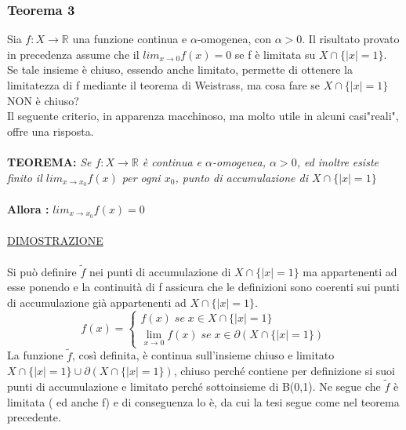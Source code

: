 \documentclass[fontsize = 20px, paper = a4]{article}
\begin{document}
\subsubsection{Teorema 3}
Sia $f: X \to \mathbb{R}$ una funzione continua e $\alpha$-omogenea, con $\alpha > 0$. Il risultato provato in precedenza assume che il $lim_{x \to 0} f(x) = 0$ se f è limitata su $X \cap \{|x| = 1\}$.\\
Se tale insieme è chiuso, essendo anche limitato, permette di ottenere la limitatezza di f mediante il teorema di Weistrass, ma cosa fare se $X \cap \{ |x| = 1\}$ NON è chiuso? \\
Il seguente criterio, in apparenza macchinoso, ma molto utile in alcuni casi"reali", offre una risposta.\\\\
\textbf{TEOREMA: }\emph{Se $f:X \to \mathbb{R}$ è continua e $\alpha$-omogenea, $\alpha > 0$, ed inoltre } \hspace*{2.3cm} \emph{esiste finito il $lim_{x \to x_0} f(x)$ per ogni $x_0$, punto di accumulazione \hspace*{2.3cm} di $X \cap \{ |x| = 1\}$}
\\ \\ \textbf{Allora : }$lim_{x \to x_0} f(x) = 0$
\\ \\ \underline{DIMOSTRAZIONE} \\ \\
Si può definire $\tilde{f}$ nei punti di accumulazione di $X \cap \{ |x| = 1 \}$ ma appartenenti ad esse ponendo 
e la continuità di f assicura che le definizioni sono coerenti sui punti di accumulazione già appartenenti ad $ X \cap \{ |x| = 1 \}$.\\
\[f(x) = \left\{
  \begin{array}{lr}
    f(x) \; se \; x \in X \cap \{|x| = 1 \} \\
    \lim_{x \to 0 } f(x) \; se \; x \in \partial(X \cap \{|x| = 1 \}) 
  \end{array}
\right.
\]
La funzione $\tilde{f}$, così definita, è continua sull'insieme chiuso e limitato $X \cap \{|x| = 1 \} \cup \partial(X \cap \{|x| = 1 \})$, chiuso perché contiene per definizione si suoi punti di accumulazione e limitato perché sottoinsieme di B(0,1). Ne segue che $\tilde{f}$ è limitata ( ed anche f) e di conseguenza lo è, da cui la tesi segue come nel teorema precedente.\\ \\
\end{document}

